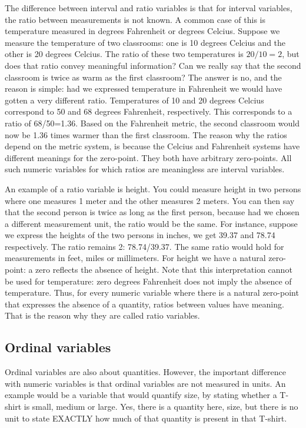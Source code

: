 \documentclass[]{report}\usepackage[]{graphicx}\usepackage[]{color}
\begin{document}
The difference between interval and ratio variables is that for interval variables, the ratio between measurements is not known. A common case of this is temperature measured in degrees Fahrenheit or degrees Celcius. Suppose we measure the temperature of two classrooms: one is 10 degrees Celcius and the other is 20 degrees Celcius. The ratio of these two temperatures is $20/10=2$, but does that ratio convey meaningful information? Can we really say that the second classroom is twice as warm as the first classroom? The answer is no, and the reason is simple: had we expressed temperature in Fahrenheit we would have gotten a very different ratio. Temperatures of 10 and 20 degrees Celcius correspond to 50 and 68 degrees Fahrenheit, respectively. This corresponds to a ratio of 68/50=1.36. Based on the Fahrenheit metric, the second classroom would now be 1.36 times warmer than the first classroom. The reason why the ratios depend on the metric system, is because the Celcius and Fahrenheit systems have different meanings for the zero-point. They both have arbitrary zero-points. All such numeric variables for which ratios are meaningless are interval variables.

An example of a ratio variable is height. You could measure height in two persons where one measures 1 meter and the other measures 2 meters. You can then say that the second person is twice as long as the first person, because had we chosen a different measurement unit, the ratio would be the same. For instance, suppose we express the heights of the two persons in inches, we get 39.37 and 78.74 respectively. The ratio remains 2: 78.74/39.37. The same ratio would hold for measurements in feet, miles or millimeters. For height we have a natural zero-point: a zero reflects the absence of height. Note that this interpretation cannot be used for temperature: zero degrees Fahrenheit does not imply the absence of temperature. Thus, for every numeric variable where there is a natural zero-point that expresses the absence of a quantity, ratios between values have meaning. That is the reason why they are called ratio variables.



\subsection{Ordinal variables}

Ordinal variables are also about quantities. However, the important difference with numeric variables is that ordinal variables are not measured in units. An example would be a variable that would quantify size, by stating whether a T-shirt is small, medium or large. Yes, there is a quantity here, size, but there is no unit to state EXACTLY how much of that quantity is present in that T-shirt.
\end{document}
